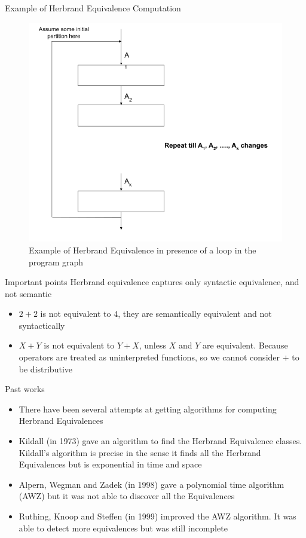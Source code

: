 \documentclass[11pt]{beamer}
\begin{document}
\begin{frame}{Example of Herbrand Equivalence Computation}
    \begin{figure}[!h]
        \centering
        \includegraphics[scale=0.3]{HerbrandEquivalenceLoop.png}
        \caption{Example of Herbrand Equivalence in presence of a loop in the program graph}
        \label{fig:herbrandExample}
    \end{figure}
\end{frame}

\begin{frame}{Important points}
    Herbrand equivalence captures only syntactic equivalence, and not semantic
    \begin{itemize}
        \item $2 + 2$ is not equivalent to $4$, they are semantically equivalent and not syntactically 
        \item $X + Y$ is not equivalent to $Y + X$, unless $X$ and $Y$ are equivalent. Because operators are treated as uninterpreted functions, so we cannot consider $+$ to be distributive
    \end{itemize}
\end{frame}

\begin{frame}{Past works}
    \begin{itemize}
        \item There have been several attempts at getting algorithms for computing Herbrand Equivalences
        \item Kildall (in 1973) gave an algorithm to find the Herbrand Equivalence classes. Kildall's algorithm is precise in the sense it finds all the Herbrand Equivalences but is exponential in time and space
        \item Alpern, Wegman and Zadek (in 1998) gave a polynomial time algorithm (AWZ) but it was not able to discover all the Equivalences
        \item Ruthing, Knoop and Steffen (in 1999) improved the AWZ algorithm. It was able to detect more equivalences but was still incomplete
    \end{itemize}
\end{frame}
\end{document}
